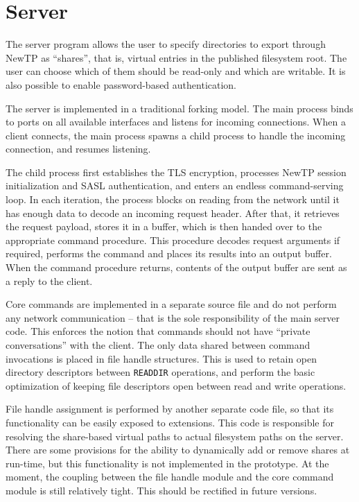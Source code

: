 \section{Server}

The server program allows the user to specify directories to export through NewTP as ``shares'', that is, virtual
entries in the published filesystem root. The user can choose which of them should be read-only and which are
writable. It is also possible to enable password-based authentication.

The server is implemented in a traditional forking model. The main process binds to ports on all available
interfaces and listens for incoming connections. When a client connects, the main process spawns a child
process to handle the incoming connection, and resumes listening.

The child process first establishes the TLS encryption, processes NewTP session initialization and SASL
authentication, and enters an endless command-serving loop. In each iteration, the process blocks on reading
from the network until it has enough data to decode an incoming request header. After that, it retrieves the
request payload, stores it in a buffer, which is then handed over to the appropriate command procedure. This
procedure decodes request arguments if required, performs the command and places its results into an output
buffer.  When the command procedure returns, contents of the output buffer are sent as a reply to the client.

Core commands are implemented in a separate source file and do not perform any network communication -- that
is the sole responsibility of the main server code. This enforces the notion that commands should not have
``private conversations'' with the client. The only data shared between command invocations is placed in file
handle structures. This is used to retain open directory descriptors between {\tt READDIR} operations, and
perform the basic optimization of keeping file descriptors open between read and write operations.

File handle assignment is performed by another separate code file, so that its functionality can be easily
exposed to extensions. This code is responsible for resolving the share-based virtual paths to actual
filesystem paths on the server. There are some provisions for the ability to dynamically add or remove shares
at run-time, but this functionality is not implemented in the prototype. At the moment, the coupling between
the file handle module and the core command module is still relatively tight. This should be rectified in
future versions.


